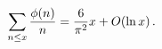 \[\sum_{n\leq x}\frac{\mathop{\phi\/}\nolimits\!\left(n\right)}{n}=\frac{6}{\pi^%
{2}}x+\mathop{O\/}\nolimits\!\left(\mathop{\ln\/}\nolimits x\right).\]